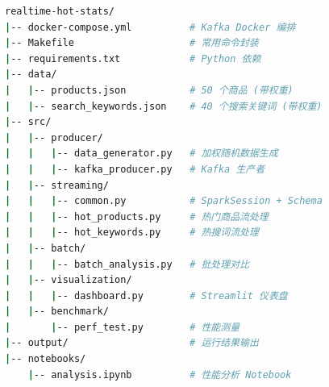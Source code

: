\documentclass[12pt,a4paper]{article}
\begin{document}
\begin{lstlisting}[language=bash, caption={项目目录结构}]
realtime-hot-stats/
|-- docker-compose.yml          # Kafka Docker 编排
|-- Makefile                    # 常用命令封装
|-- requirements.txt            # Python 依赖
|-- data/
|   |-- products.json           # 50 个商品 (带权重)
|   |-- search_keywords.json    # 40 个搜索关键词 (带权重)
|-- src/
|   |-- producer/
|   |   |-- data_generator.py   # 加权随机数据生成
|   |   |-- kafka_producer.py   # Kafka 生产者
|   |-- streaming/
|   |   |-- common.py           # SparkSession + Schema
|   |   |-- hot_products.py     # 热门商品流处理
|   |   |-- hot_keywords.py     # 热搜词流处理
|   |-- batch/
|   |   |-- batch_analysis.py   # 批处理对比
|   |-- visualization/
|   |   |-- dashboard.py        # Streamlit 仪表盘
|   |-- benchmark/
|       |-- perf_test.py        # 性能测量
|-- output/                     # 运行结果输出
|-- notebooks/
    |-- analysis.ipynb          # 性能分析 Notebook
\end{lstlisting}
\end{document}
